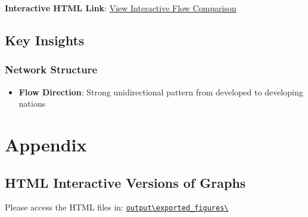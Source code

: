 \documentclass[
  11pt,
]{article}
\providecommand{\tightlist}{%
  \setlength{\itemsep}{0pt}\setlength{\parskip}{0pt}}\usepackage{longtable,booktabs,array}
\begin{document}
\textbf{Interactive HTML Link}:
\href{https://github.com/WilliamClintC/RER/blob/main/_output/exported_figures/09_comparison_top50_vs_all_flows.html}{View
Interactive Flow Comparison}

\subsection{Key Insights}\label{key-insights}

\subsubsection{Network Structure}\label{network-structure}

\begin{itemize}
\tightlist
\item
  \textbf{Flow Direction}: Strong unidirectional pattern from developed
  to developing nations
\end{itemize}

\section{Appendix}\label{appendix}

\subsection{HTML Interactive Versions of
Graphs}\label{html-interactive-versions-of-graphs}

Please access the HTML files in:
\href{https://github.com/WilliamClintC/RER/tree/main/_output/exported_figures}{\texttt{output\textbackslash{}exported\_figures\textbackslash{}}}


\printbibliography
\end{document}
